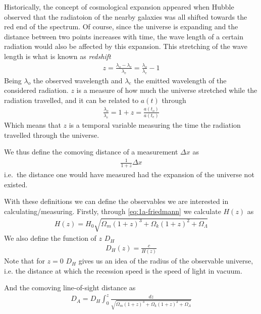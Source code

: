 Historically, the concept of cosmological expansion appeared when Hubble observed that the radiatoion of the nearby galaxies was all shifted towards the red end of the spectrum. Of course, since the universe is expanding and the distance between two points increases with time, the wave length of a certain radiation would also be affected by this expansion. This stretching of the wave length is what is known as \textit{redshift} 
\begin{align}
	z = \frac{\lambda_{\text{o}} - \lambda_{\text{e}}}{\lambda_{\text{e}}} = \frac{\lambda_o}{\lambda_e} - 1
	\label{eq:redshift}
\end{align}
Being $\lambda_o$ the observed wavelength and $\lambda_e$ the emitted wavelength of the considered radiation. $z$ is a measure of how much the universe stretched while the radiation travelled, and it can be related to $a(t)$ through 
\begin{align}
	\frac{\lambda_o}{\lambda_e} = 1+z = \frac{a(t_o)}{a(t_e)}
\end{align}
Which means that $z$ is a temporal variable measuring the time the radiation travelled through the universe.

We thus define the comoving distance of a measurement $\Delta x$ as 
\begin{align}
	\frac{1}{1+z}\Delta x
\end{align}
i.e.\ the distance one would have measured had the expansion of the universe not existed.

With these definitions we can define  the observables we are interested in calculating/measuring. Firstly, through \eqref{eq:1a-friedmann} we calculate $H(z)$ as  
\begin{align}
	H(z) = H_0 \sqrt{\Omega_m(1+z)^3 + \Omega_k(1+z)^2 + \Omega_\Lambda} 
\end{align}
We also define the function of $z$ $D_H$
\begin{align}
	D_H(z)  = \frac{c}{H(z)}
\end{align}
Note that for $z = 0$ $D_H$ gives us an idea of the radius of the observable universe, i.e. the distance at which the recession speed is the speed of light in vacuum.

And the comoving line-of-sight distance as 
\begin{align}
	D_A = D_H\int_{0}^{z} \frac{dz}{\sqrt{\Omega_m(1+z)^3 + \Omega_k(1+z)^2 + \Omega_\Lambda} } 
\end{align}
